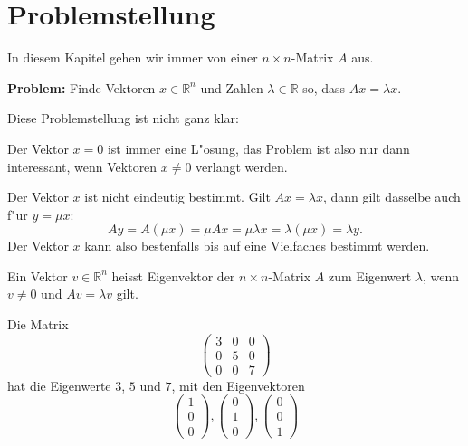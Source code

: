 \section{Problemstellung}
In diesem Kapitel gehen wir immer von einer $n\times n$-Matrix $A$ aus.

\medskip
{\parindent0pt \bf Problem:} Finde Vektoren $x\in\mathbb R^n$ und
Zahlen $\lambda\in\mathbb R$ so, dass $Ax=\lambda x$.
\medskip

{\parindent0pt Diese Problemstellung ist nicht ganz klar:}
\begin{compactitem}
\item Der Vektor $x=0$ ist immer eine L"osung, das Problem ist also
nur dann interessant, wenn Vektoren $x\ne 0$ verlangt werden.
\item Der Vektor $x$ ist nicht eindeutig bestimmt. Gilt $Ax=\lambda x$,
dann gilt dasselbe auch f"ur $y=\mu x$:
\[
Ay= A(\mu x)=\mu Ax=\mu\lambda x = \lambda (\mu x)=\lambda y.
\]
Der Vektor $x$ kann also bestenfalls bis auf eine Vielfaches
bestimmt werden.
\end{compactitem}

\begin{definition}
Ein Vektor $v \in \mathbb R^n$ heisst Eigenvektor der $n\times n$-Matrix $A$
zum Eigenwert $\lambda$, wenn $v\ne 0$ und $Av=\lambda v$ gilt.
\end{definition}

\begin{beispiel}
Die Matrix
$$\begin{pmatrix}
3&0&0\\
0&5&0\\
0&0&7
\end{pmatrix}$$
hat die Eigenwerte $3$, $5$ und $7$, mit den Eigenvektoren
\[
\begin{pmatrix}
1\\0\\0
\end{pmatrix}
,
\begin{pmatrix}
0\\1\\0
\end{pmatrix}
,
\begin{pmatrix}
0\\0\\1
\end{pmatrix}
\]
\end{beispiel}

